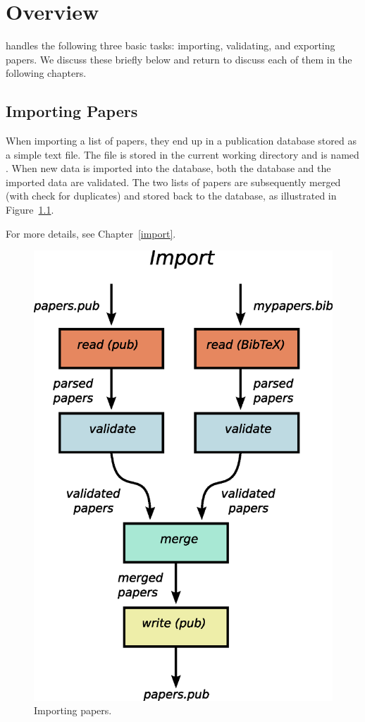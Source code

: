 \chapter{Overview}

\package{} handles the following three basic tasks: importing,
validating, and exporting papers. We discuss these briefly below and
return to discuss each of them in the following chapters.

\section{Importing Papers}

When importing a list of papers, they end up in a publication
database stored as a simple text file. The file is stored in the
current working directory and is named . When new data is
imported into the database, both the database and the imported data
are validated. The two lists of papers are subsequently merged (with
check for duplicates) and stored back to the database, as illustrated
in Figure~\ref{fig:import}.

For more details, see Chapter~\ref{import}.

\begin{figure}[htbp]
  \begin{center}
    \includegraphics[width=12cm]{images/import.eps}
    \caption{Importing papers.}
    \label{fig:import}
  \end{center}
\end{figure}


